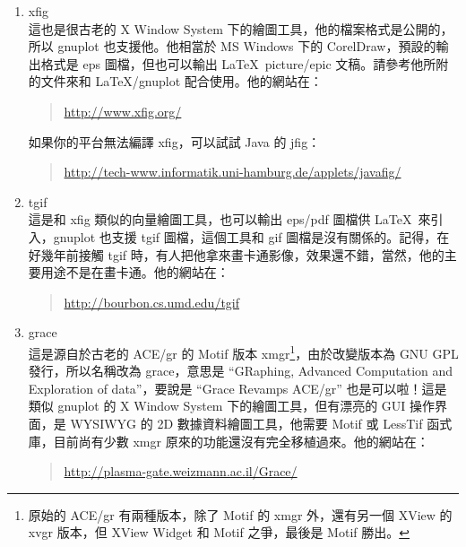 \begin{enumerate}
  \item {\sffamily xfig}\\
        這也是很古老的 X Window System 下的繪圖工具，他的檔案格式是公開的，所以 {\sffamily gnuplot} 也支援他。他相當於 MS Windows 下的 {\sffamily CorelDraw}，預設的輸出格式是 eps 圖檔，但也可以輸出 \LaTeX\ {\ttfamily picture/}{\sffamily epic} 文稿。請參考他所附的文件來和 \LaTeX/{\sffamily gnuplot} 配合使用。他的網站在：

        \begin{quote}
          \url{http://www.xfig.org/}
        \end{quote}

        如果你的平台無法編譯 {\sffamily xfig}，可以試試 Java 的 {\sffamily jfig}：

        \begin{quote}
          \url{http://tech-www.informatik.uni-hamburg.de/applets/javafig/}
        \end{quote}

  \item {\sffamily tgif}\\
        這是和 {\sffamily xfig} 類似的向量繪圖工具，也可以輸出 eps/pdf 圖檔供 \LaTeX\ 來引入，{\sffamily gnuplot} 也支援 {\sffamily tgif} 圖檔，這個工具和 gif 圖檔是沒有關係的。記得，在好幾年前接觸 {\sffamily tgif} 時，有人把他拿來畫卡通影像，效果還不錯，當然，他的主要用途不是在畫卡通。他的網站在：

        \begin{quote}
          \url{http://bourbon.cs.umd.edu/tgif}
        \end{quote}

  \item {\sffamily grace}\\
        這是源自於古老的 {\sffamily ACE/gr} 的 Motif 版本 {\sffamily xmgr}\footnote{原始的 {\sffamily ACE/gr} 有兩種版本，除了 Motif 的 {\sffamily xmgr} 外，還有另一個 XView 的 {\sffamily xvgr} 版本，但 XView Widget 和 Motif 之爭，最後是 Motif 勝出。}，由於改變版本為 GNU GPL 發行，所以名稱改為 {\sffamily grace}，意思是 ``GRaphing, Advanced Computation and Exploration of data''，要說是 ``Grace Revamps ACE/gr'' 也是可以啦！這是類似 {\sffamily gnuplot} 的 X Window System 下的繪圖工具，但有漂亮的 GUI 操作界面，是 WYSIWYG 的 2D 數據資料繪圖工具，他需要 Motif 或 LessTif 函式庫，目前尚有少數 {\sffamily xmgr} 原來的功能還沒有完全移植過來。他的網站在：

        \begin{quote}
          \url{http://plasma-gate.weizmann.ac.il/Grace/}
        \end{quote}


\end{enumerate}
